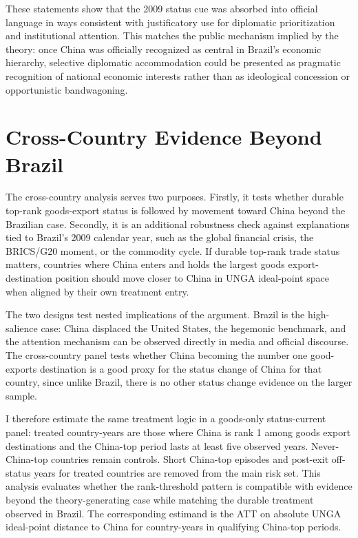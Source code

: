 \documentclass[
  12pt,
]{article}
\begin{document}
These statements show that the 2009 status cue was absorbed into official language in ways consistent with justificatory use for diplomatic prioritization and institutional attention. This matches the public mechanism implied by the theory: once China was officially recognized as central in Brazil's economic hierarchy, selective diplomatic accommodation could be presented as pragmatic recognition of national economic interests rather than as ideological concession or opportunistic bandwagoning.

\section{Cross-Country Evidence Beyond Brazil}\label{cross-country-evidence-beyond-brazil}

The cross-country analysis serves two purposes. Firstly, it tests whether durable top-rank goods-export status is followed by movement toward China beyond the Brazilian case. Secondly, it is an additional robustness check against explanations tied to Brazil's 2009 calendar year, such as the global financial crisis, the BRICS/G20 moment, or the commodity cycle. If durable top-rank trade status matters, countries where China enters and holds the largest goods export-destination position should move closer to China in UNGA ideal-point space when aligned by their own treatment entry.

The two designs test nested implications of the argument. Brazil is the high-salience case: China displaced the United States, the hegemonic benchmark, and the attention mechanism can be observed directly in media and official discourse. The cross-country panel tests whether China becoming the number one good-exports destination is a good proxy for the status change of China for that country, since unlike Brazil, there is no other status change evidence on the larger sample.

I therefore estimate the same treatment logic in a goods-only status-current panel: treated country-years are those where China is rank 1 among goods export destinations and the China-top period lasts at least five observed years. Never-China-top countries remain controls. Short China-top episodes and post-exit off-status years for treated countries are removed from the main risk set. This analysis evaluates whether the rank-threshold pattern is compatible with evidence beyond the theory-generating case while matching the durable treatment observed in Brazil. The corresponding estimand is the ATT on absolute UNGA ideal-point distance to China for country-years in qualifying China-top periods.
\end{document}
